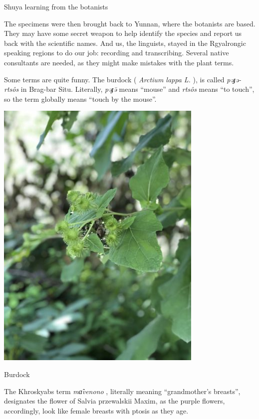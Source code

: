 \documentclass[
  a4paper,
  14pt,
  oneside,
  tablecaptionabove
]{scrbook}
\begin{document}
Shuya learning from the botanists

The specimens were then brought back to Yunnan, where the botanists are
based. They may have some secret weapon to help identify the species and
report us back with the scientific names. And us, the linguists, stayed
in the Rgyalrongic speaking regions to do our job: recording and
transcribing. Several native consultants are needed, as they might make
mistakes with the plant terms.

Some terms are quite funny. The burdock ( \emph{Arctium lappa L.} ), is
called \emph{pəɟə-rtsôs} in Brag-bar Situ. Literally, \emph{pəɟə̄} means
\enquote{mouse} and \emph{rtsôs} means \enquote{to touch}, so the term
globally means \enquote{touch by the mouse}.

\leavevmode\hypertarget{attachment_2159}{}%
\includegraphics[width=3.90625in,height=5.20833in]{images/IMG_7164-e1575732684598-375x500.jpg}

Burdock

The Khroskyabs term \emph{mɑ̂venono} , literally meaning
\enquote{grandmother's breasts}, designates the flower of Salvia
przewalskii Maxim, as the purple flowers, accordingly, look like female
breasts with ptosis as they age.
\end{document}

